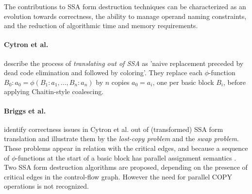 The contributions to SSA form destruction techniques can be characterized as an
evolution towards correctness, the ability to manage operand naming constraints,
and the reduction of algorithmic time and memory requirements.

\paragraph{Cytron et al. \cite{Cytron:1991:TOPLAS}} describe the process of
\emph{translating out of SSA} as 'naive replacement preceded by dead code
elimination and followed by coloring'. They replace each $\phi$-function
$B_0:a_0=\phi(B_1:a_1,\dots,B_n:a_n)$ by $n$ copies $a_0 = a_i$, one per basic
block $B_i$, before applying Chaitin-style coalescing.

\paragraph{Briggs et al. \cite{Briggs:1998:SPE}} identify correctness issues in
Cytron et al. \cite{Cytron:1991:TOPLAS} out of (transformed) SSA form
translation and illustrate them by the \emph{lost-copy problem} and the
\emph{swap problem}. These problems appear in relation with the critical edges,
and because a sequence of $\phi$-functions at the start of a basic block has
parallel assignment semantics \cite{Boissinot:2009:CGO}. Two SSA form
destruction algorithms are proposed, depending on the presence of critical edges
in the control-flow graph. However the need for parallel COPY operations is not
recognized.

